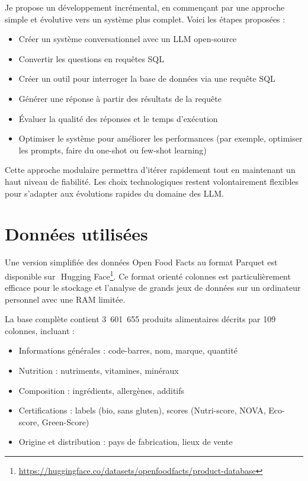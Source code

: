 \documentclass[a4paper,11pt]{article}
\begin{document}
Je propose un développement incrémental, en commençant par une approche simple et évolutive vers un système plus complet.
Voici les étapes proposées :

\begin{itemize}
    \item Créer un système conversationnel avec un LLM open-source 
    \item Convertir les questions en requêtes SQL
    \item Créer un outil pour interroger la base de données via une requête SQL
    \item Générer une réponse à partir des résultats de la requête
    \item Évaluer la qualité des réponses et le temps d'exécution
    \item Optimiser le système pour améliorer les performances (par exemple, optimiser les prompts, faire du one-shot ou few-shot learning)
\end{itemize}

Cette approche modulaire permettra d'itérer rapidement tout en maintenant un haut niveau de fiabilité. Les choix technologiques restent volontairement flexibles pour s'adapter aux évolutions rapides du domaine des LLM.


\section{Données utilisées}
\label{sec:donnees}

Une version simplifiée des données Open Food Facts au format Parquet est disponible sur~\,Hugging 
Face\footnote{\url{https://huggingface.co/datasets/openfoodfacts/product-database}}. 
Ce format orienté colonnes est particulièrement efficace pour le stockage et l'analyse de grands jeux de données sur un ordinateur personnel avec une RAM limitée.

La base complète contient 3~601~655 produits alimentaires décrits par 109 colonnes, incluant :

\begin{itemize}
    \item Informations générales : code-barres, nom, marque, quantité
    \item Nutrition : nutriments, vitamines, minéraux
    \item Composition : ingrédients, allergènes, additifs
    \item Certifications : labels (bio, sans gluten), scores (Nutri-score, NOVA, Eco-score, Green-Score)
    \item Origine et distribution : pays de fabrication, lieux de vente
\end{itemize}
\end{document}
